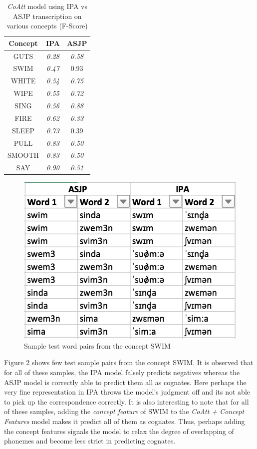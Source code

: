 \documentclass[11pt,letterpaper]{article}
\begin{document}
\begin{table}[h]
\centering
\begin{tabular}{ccc}
\textbf{Concept} & \textbf{IPA}  & \textbf{ASJP} \\ \hline
GUTS             & \textit{0.28} & \textit{0.58} \\
SWIM             & \textit{0.47} & 0.93          \\
WHITE            & \textit{0.54} & \textit{0.75} \\
WIPE             & \textit{0.55} & \textit{0.72} \\
SING             & \textit{0.56} & \textit{0.88} \\ \hline
FIRE             & \textit{0.62} & \textit{0.33} \\
SLEEP            & \textit{0.73} & 0.39          \\
PULL             & \textit{0.83} & \textit{0.50} \\
SMOOTH           & \textit{0.83} & \textit{0.50} \\
SAY              & \textit{0.90} & \textit{0.51}
\end{tabular}
\caption{\textit{CoAtt} model using IPA vs ASJP transcription on various concepts (F-Score)}
\end{table}

\begin{figure}[t]
\centering
  \includegraphics[width=.9\linewidth]{swim}
  \caption{Sample test word pairs from the concept SWIM}
  \label{disssim}
\end{figure}

Figure 2 shows few test sample pairs from the concept SWIM. It is observed that for all of these samples, the IPA model falsely predicts negatives whereas the ASJP model is correctly able to predict them all as cognates. Here perhaps the very fine representation in IPA throws the model's judgment off and its not able to pick up the correspondence correctly. It is also interesting to note that for all of these samples, adding the \textit{concept feature} of SWIM to the \textit{CoAtt + Concept Features} model makes it predict all of them as cognates. Thus, perhaps adding the concept features signals the model to relax the degree of overlapping of phonemes and become less strict in predicting cognates.
\end{document}
